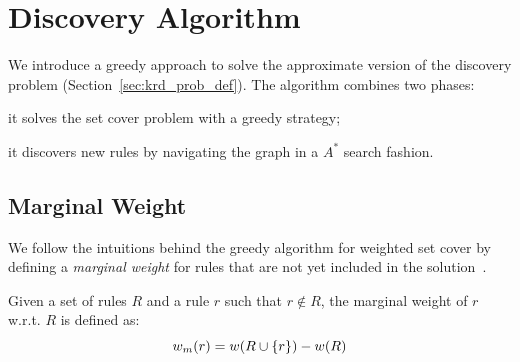 \section{Discovery Algorithm} \label{sec:krd_greedy}
We introduce a greedy approach to solve the approximate version of the discovery problem (Section~\ref{sec:krd_prob_def}). The algorithm combines two phases:
\begin{inparaenum}[\itshape(i)]
	\item it solves the set cover problem with a greedy strategy;
	\item it discovers new rules by navigating the graph in a $A^*$ search fashion.
\end{inparaenum}

\subsection{Marginal Weight}
We follow the intuitions behind the greedy algorithm for weighted set cover by defining a \emph{marginal weight} for rules that are not yet included in the solution~\cite{chvatal1979greedy}.

\begin{definition}
	Given a set of rules $R$ and a rule $r$ such that $r \notin R$, the marginal weight of $r$ w.r.t. $R$ is defined as:
	\begin{equation*}
	w_m(r) = w(R \cup \{r\}) - w(R) 
		\vspace{-0.5ex}
	\end{equation*}
\end{definition}

